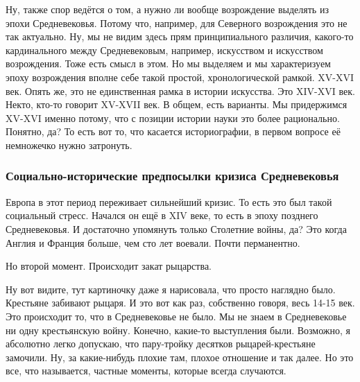 Ну, также спор ведётся о
том, а нужно ли вообще возрождение выделять из эпохи Средневековья. Потому что,
например, для Северного возрождения это не так актуально. Ну, мы не видим здесь
прям принципиального различия, какого-то кардинального между Средневековым,
например, искусством и искусством возрождения. Тоже есть смысл в этом. Но мы
выделяем и мы характеризуем эпоху возрождения вполне себе такой простой,
хронологической рамкой. XV-XVI век. Опять же, это не единственная рамка в
истории искусства. Это XIV-XVI век. Некто, кто-то говорит XV-XVII век. В общем,
есть варианты. Мы придержимся XV-XVI именно потому, что с позиции истории науки
это более рационально. Понятно, да? То есть вот то, что касается историографии,
в первом вопросе её немножечко нужно затронуть. 

\subsubsection{Социально-исторические предпосылки кризиса Средневековья}

Европа в этот период переживает
сильнейший кризис. То есть это был такой социальный стресс. Начался он ещё в XIV
веке, то есть в эпоху позднего Средневековья. И достаточно упомянуть только
Столетние войны, да? Это когда Англия и Франция больше, чем сто лет воевали.
Почти перманентно. 


Но второй момент. Происходит закат рыцарства. 

Ну вот видите, тут картиночку даже я нарисовала, что просто наглядно
было. Крестьяне забивают рыцаря. И это вот как раз, собственно говоря, весь
14-15 век. Это происходит то, что в Средневековье не было. Мы не знаем в
Средневековье ни одну крестьянскую войну. Конечно, какие-то выступления были.
Возможно, я абсолютно легко допускаю, что пару-тройку десятков рыцарей-крестьяне
замочили. Ну, за какие-нибудь плохие там, плохое отношение и так далее. Но это
все, что называется, частные моменты, которые всегда случаются. 

